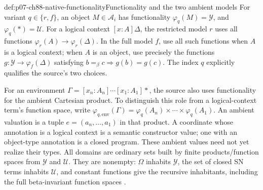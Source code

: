 \begin{hbdefinition}{def:p07-ch88-native-functionality}{Functionality and the two ambient models}
For variant \(q\in\{r,f\}\), an object \(M\in\mathcal A_i\)
has functionality \(\varphi_q(M)=\mathcal Y\), and
\(\varphi_q(\ast)=\mathcal U\). For a logical context
\([x:A]\Delta\), the restricted model \(r\) uses all functions
\(\varphi_r(A)\to\varphi_r(\Delta)\). In the full model \(f\),
use all such functions when \(A\) is a logical context; when \(A\)
is an object, use precisely the functions
\(g:\mathcal Y\to\varphi_f(\Delta)\) satisfying
\(b=_\beta c\Rightarrow g(b)=g(c)\).
The index \(q\) explicitly qualifies the source's two choices.

For an environment \(\Gamma=[x_n:A_n]\cdots[x_1:A_1]\ast\),
the source also uses functionality for the ambient Cartesian product.
To distinguish this role from a logical-context term's function space,
write
\(\varphi_{q,\mathrm{env}}(\Gamma)=
\varphi_q(A_n)\times\cdots\times\varphi_q(A_1)\).
An ambient valuation is a tuple \(e=(a_n,\ldots,a_1)\) in that
product. A coordinate whose annotation is a logical context is a
semantic constructor value; one with an object-type annotation is a
closed program. These ambient values need not yet realize their types.
All domains are ordinary sets built by finite products/function spaces
from \(\mathcal Y\) and \(\mathcal U\). They are nonempty:
\(\Omega\) inhabits \(\mathcal Y\), the set of closed SN terms
inhabits \(\mathcal U\), and constant functions give the recursive
inhabitants, including the full beta-invariant function spaces
\cite[pp.~107--108]{CoquandHuet1988}.
\end{hbdefinition}

